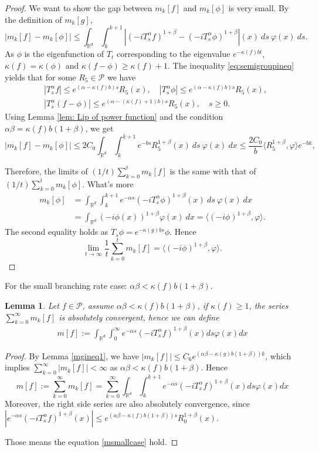 \documentclass[12pt, a4paper]{amsart}
\newtheorem{lem}[thm]{Lemma}
\theoremstyle{definition}
\numberwithin{equation}{section}
\begin{document}
\begin{proof}
    We want to show the gap between $m_k[f]$ and $m_k[\phi]$ is very small. By the definition of $m_k[g]$,
    $$|m_k[f]-m_k[\phi]|\leq\int_{\mathbb{R}^d}\int_k^{k+1}\left|(-i T^{\alpha}_s f)^{1+\beta}-(-i T^{\alpha}_s \phi)^{1+\beta}\right|(x)~ds~\varphi(x)~ds.$$
    As $\phi$ is the eigenfunction of $T_t$ corresponding to the eigenvalue $e^{-\kappa(f)bt}$,  $\kappa(f)=\kappa(\phi)$ and $\kappa(f-\phi)\geq \kappa(f)+1$. The inequality \eqref{eq:semigroupineq} yields that for some $R_5\in\mathcal{P}$ we have
    \begin{align*}
        &|T_s^{\alpha}f|\leq e^{(\alpha-\kappa(f)b)s}R_5(x), \quad|T_s^{\alpha}\phi|\leq e^{(\alpha-\kappa(f)b)s}R_5(x), \\
        &|T_s^{\alpha}(f-\phi)|\leq e^{(\alpha-(\kappa(f)+1)b)s}R_5(x), \quad s\geq0.
    \end{align*}
  Using Lemma \ref{lem: Lip of power function} and the condition $\alpha\beta=\kappa(f)b(1+\beta)$, we get
    $$|m_k[f]-m_k[\phi]|\leq2C_0\int_{\mathbb{R}^d}\int_k^{k+1}e^{-bs}R_5^{1+\beta}(x)~ds~\varphi(x)~dx\leq \frac{2C_0}{b}\langle R_5^{1+\beta},\varphi\rangle e^{-bk},$$

    Therefore, the limits of $(1/t)\sum_{k=0}^tm_k[f]$ is the same with that of $(1/t)\sum_{k=0}^tm_k[\phi]$. What's more
    \begin{align*}
        m_k[\phi]&=\int_{\mathbb{R}^d}\int_k^{k+1} e^{-\alpha s}(-iT_{s}^{\alpha}\phi)^{1+\beta}(x)~ds~\varphi(x)~dx\\
        &=\int_{\mathbb{R}^d}(-i\phi(x))^{1+\beta}\varphi (x)~dx=\langle (-i\phi)^{1+\beta},\varphi\rangle.
    \end{align*}
    The second equality holds as $T_s\phi=e^{-\kappa(g)bs}\phi$. Hence
    $$\lim_{t\rightarrow \infty}\frac{1}{t}\sum_{k=0}^{t}m_k[f]=\langle(-i\phi)^{1+\beta},\varphi\rangle.$$
\end{proof}

For the small branching rate case: $\alpha\beta<\kappa(f)b(1+\beta)$.
\begin{lem}\label{lemma211}
Let $f\in \mathcal{P}$, assume $\alpha\beta<\kappa(f)b(1+\beta)$, if $\kappa(f)\geq 1$, the series $\sum_{k=0}^{\infty}m_k[f]$ is absolutely convergent, hence we can define
\begin{align}
    m[f]:=\int_{\mathbb{R}^d}\int_0^{\infty} e^{-\alpha s}(-iT_{s}^{\alpha}f)^{1+\beta}(x)ds\varphi(x)dx \label{msmallcase}
\end{align}
\end{lem}
\begin{proof}
    By Lemma \ref{mgineq1}, we have $|m_k[f]|\leq C_6 e^{(\alpha\beta-\kappa(g)b(1+\beta))k}$, which implies $\sum_{k=0}^{\infty}|m_k[f]|<\infty$ as $\alpha\beta<\kappa(f)b(1+\beta)$. Hence
    $$m[f]:=\sum_{k=0}^{\infty}m_k[f]=\sum_{k=0}^{\infty}\int_{\mathbb{R}^d}\int_k^{k+1} e^{-\alpha s}(-iT_{s}^{\alpha}f)^{1+\beta}(x)ds\varphi(x)dx$$
     Moreover, the right side series are also absolutely convergence, since $|e^{-\alpha s}(-iT_{s}^{\alpha}f)^{1+\beta}(x)|\leq e^{(\alpha\beta-\kappa(f)b(1+\beta))s}R_0^{1+\beta}(x)$.

     Those means the equation \eqref{msmallcase} hold.
\end{proof}
\end{document}
